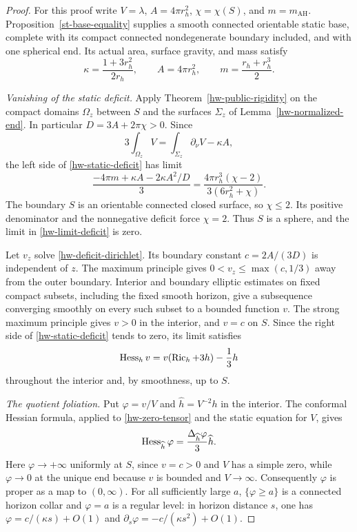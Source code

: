 \begin{proof}
For this proof write $V=\lambda$, $A=4\pi r_h^2$,
$\chi=\chi(S)$, and $m=m_{\mathrm{AH}}$.
Proposition~\ref{st-base-equality} supplies a smooth connected
orientable static base, complete with its compact connected
nondegenerate boundary included, and with one spherical end.
Its actual area, surface gravity, and mass satisfy
\begin{equation}\label{hw-equality-surface-gravity}
 \kappa=\frac{1+3r_h^2}{2r_h},\qquad
 A=4\pi r_h^2,\qquad m=\frac{r_h+r_h^3}{2}.
\end{equation}

\emph{Vanishing of the static deficit.}
Apply Theorem~\ref{hw-public-rigidity} on the compact domains
$\Omega_z$ between $S$ and the surfaces $\Sigma_z$ of
Lemma~\ref{hw-normalized-end}.  In particular
$D=3A+2\pi\chi>0$.  Since
\[
 3\int_{\Omega_z}V
       =\int_{\Sigma_z}\partial_\nu V-\kappa A,
\]
the left side of \eqref{hw-static-deficit} has limit
\begin{equation}\label{hw-limit-deficit}
 \frac{-4\pi m+\kappa A-2\kappa A^2/D}{3}
       =\frac{4\pi r_h^3(\chi-2)}{3(6r_h^2+\chi)}.
\end{equation}
The boundary $S$ is an orientable connected closed surface, so
$\chi\leq2$.  Its positive denominator and the nonnegative
deficit force $\chi=2$.  Thus $S$ is a sphere, and the limit in
\eqref{hw-limit-deficit} is zero.

Let $v_z$ solve \eqref{hw-deficit-dirichlet}.  Its boundary constant
$c=2A/(3D)$ is independent of $z$.  The maximum principle gives
$0<v_z\leq\max(c,1/3)$ away from the outer boundary.
Interior and boundary elliptic estimates on fixed compact subsets,
including the fixed smooth horizon, give a subsequence converging
smoothly on every such subset to a bounded function $v$.
The strong maximum principle gives $v>0$ in the interior,
and $v=c$ on $S$.  Since the right side of
\eqref{hw-static-deficit} tends to zero, its limit satisfies
\begin{equation}\label{hw-zero-tensor}
 \operatorname{Hess}_hv=v(\operatorname{Ric}_h+3h)-\frac13h
\end{equation}
throughout the interior and, by smoothness, up to $S$.

\emph{The quotient foliation.}
Put $\varphi=v/V$ and $\widehat h=V^{-2}h$ in the interior.
The conformal Hessian formula, applied to
\eqref{hw-zero-tensor} and the static equation for $V$, gives
\begin{equation}\label{hw-concircular-quotient}
 \operatorname{Hess}_{\widehat h}\varphi
       =\frac{\Delta_{\widehat h}\varphi}{3}\widehat h.
\end{equation}
Here $\varphi\to+\infty$ uniformly at $S$, since $v=c>0$
and $V$ has a simple zero, while $\varphi\to0$ at the unique
end because $v$ is bounded and $V\to\infty$.
Consequently $\varphi$ is proper as a map to $(0,\infty)$.
For all sufficiently large $a$, $\{\varphi\geq a\}$ is a
connected horizon collar and $\varphi=a$ is a regular level:
in horizon distance $s$, one has
$\varphi=c/(\kappa s)+O(1)$ and
$\partial_s\varphi=-c/(\kappa s^2)+O(1)$.


\end{proof}
